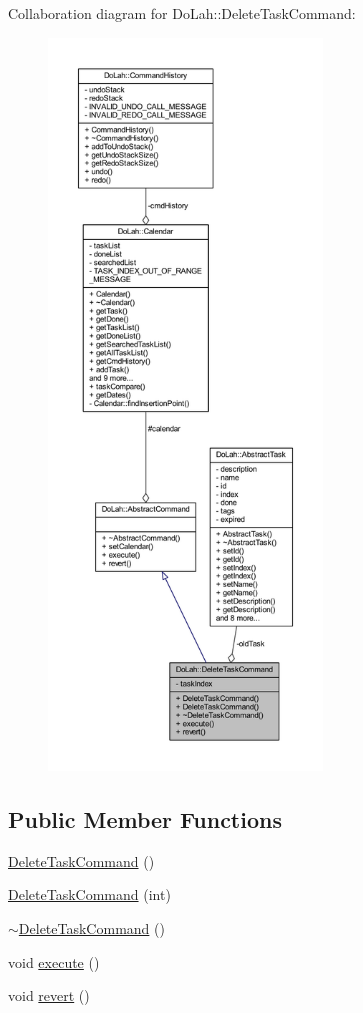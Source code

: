 Collaboration diagram for Do\+Lah\+:\+:Delete\+Task\+Command\+:\nopagebreak
\begin{figure}[H]
\begin{center}
\leavevmode
\includegraphics[height=550pt]{class_do_lah_1_1_delete_task_command__coll__graph}
\end{center}
\end{figure}
\subsection*{Public Member Functions}
\begin{DoxyCompactItemize}
\item 
\hyperlink{class_do_lah_1_1_delete_task_command_a34571f8be25163f19e7bb2f5fe674c52}{Delete\+Task\+Command} ()
\item 
\hyperlink{class_do_lah_1_1_delete_task_command_a14b6965d5da7ab9e7fb723bbee91eded}{Delete\+Task\+Command} (int)
\item 
\hyperlink{class_do_lah_1_1_delete_task_command_ac6abc2b53e95c6605a43d13f322d1452}{$\sim$\+Delete\+Task\+Command} ()
\item 
void \hyperlink{class_do_lah_1_1_delete_task_command_ad0c00ebde581c2a850b9a2341b001d70}{execute} ()
\item 
void \hyperlink{class_do_lah_1_1_delete_task_command_a07e77b62d20d1c8e5d1f7c1568d796a7}{revert} ()
\end{DoxyCompactItemize}
